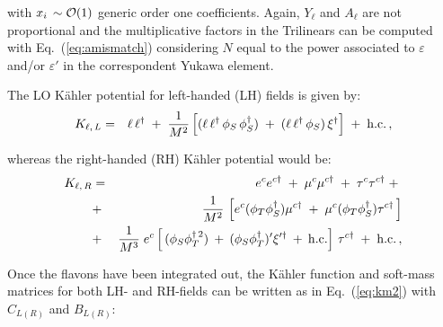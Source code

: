 \documentclass[a4paper,11pt]{article}
\newcommand{\bea}{\begin{eqnarray}}
\newcommand{\eea}{\end{eqnarray}}
\newcommand{\vep}{\varepsilon}
\newcommand{\nn}{\nonumber}
\newcommand{\eq}[1]{Eq.~(\ref{#1})}
\begin{document}
with $x_i\, \sim {\cal O}(1)$ generic order one coefficients. Again, $Y_\ell$ and $A_\ell$ are not proportional and the multiplicative factors in the Trilinears can be computed with \eq{eq:amismatch} considering $N$ equal to the power associated to $\vep$ and/or $\vep'$ in the correspondent Yukawa element. 

The LO K\"ahler potential for left-handed (LH) fields is given by: 
\bea \label{eqn:A4KL}
  K_{\ell,\, L} & = & \ell\,\ell^\dagger \;+\; \frac{1}{M^2}\left[(\ell\,\ell^\dagger\,\phi_S\,\phi_S^\dagger) \;+\; (\ell\,\ell^\dagger\,\phi_S)\,\xi^\dagger\right] \;+\;  {\rm h.c.}\,,
\eea

whereas the right-handed (RH) K\"ahler potential would be:
\bea \label{eqn:A4KR}
  K_{\ell,\, R} & = & e^c e^{c\dagger}\;+\; \mu^c \mu^{c\dagger}\;+\; \tau^c \tau^{c\dagger}\;+\; \nn\\
  & + & \frac{1}{M^2}\, \left[e^c (\phi_T\phi_S^\dagger )\mu^{c\dagger} \;+\; \mu^c(\phi_T\phi_S^\dagger ) \tau^{c\dagger}\, \right] \\
  & + & \frac{1}{M^3}\; e^c \left[\, (\phi_S\phi_T^{\dagger\, 2}) \:+\: (\phi_S\phi_T^{\dagger})'\xi'^\dagger \:+\: {\rm h.c.} \right]\,\tau^{c\dagger} \;+\; {\rm h.c.}\, \nn,
\eea

Once the flavons have been integrated out, the K\"ahler function and soft-mass matrices for both LH- and RH-fields can be written as in \eq{eq:km2} with $C_{L(R)}$ and $B_{L(R)}$:
\end{document}
